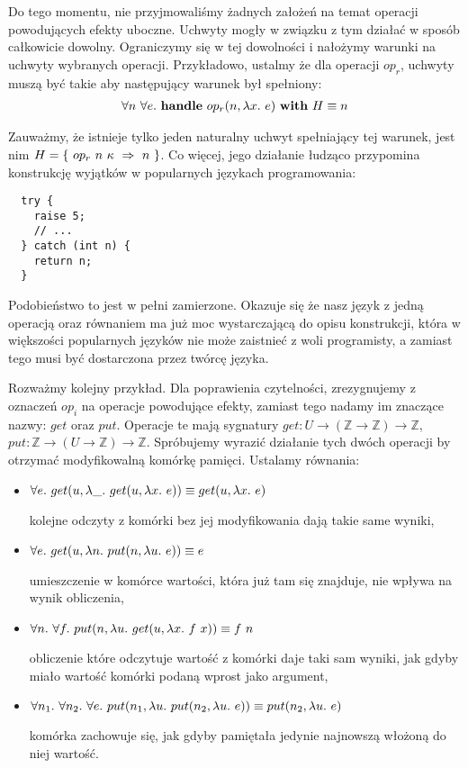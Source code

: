 Do tego momentu, nie przyjmowaliśmy żadnych założeń na temat operacji powodujących efekty uboczne. Uchwyty mogły w związku z tym działać w sposób całkowicie dowolny. Ograniczymy się w tej dowolności i nałożymy warunki na uchwyty wybranych operacji. Przykładowo, ustalmy że dla operacji \(op_r\), uchwyty muszą być takie aby następujący warunek był spełniony:
\begin{align}
  \forall n\ \forall e.\ \mathbf{handle}\ op_r(n, \lambda x.\ e)\ \mathbf{with}\ H \equiv n
\end{align}

Zauważmy, że istnieje tylko jeden naturalny uchwyt spełniający tej warunek, jest nim \(H = \{\ \hcase{op_r}{n\ \kappa}{n} \ \}\). Co więcej, jego działanie łudząco przypomina konstrukcję wyjątków w popularnych językach programowania:

\begin{lstlisting}
  try {
    raise 5;
    // ...
  } catch (int n) {
    return n;
  }
\end{lstlisting}

Podobieństwo to jest w pełni zamierzone. Okazuje się że nasz język z jedną operacją oraz równaniem ma już moc wystarczającą do opisu konstrukcji, która w większości popularnych języków nie może zaistnieć z woli programisty, a zamiast tego musi być dostarczona przez twórcę języka.

Rozważmy kolejny przykład. Dla poprawienia czytelności, zrezygnujemy z oznaczeń \(op_i\) na operacje powodujące efekty, zamiast tego nadamy im znaczące nazwy: \(get\) oraz \(put\). Operacje te mają sygnatury \(get: U \rightarrow (\mathbb{Z} \rightarrow \mathbb{Z}) \rightarrow \mathbb{Z}\), \(put: \mathbb{Z} \rightarrow (U \rightarrow \mathbb{Z}) \rightarrow \mathbb{Z}\). Spróbujemy wyrazić działanie tych dwóch operacji by otrzymać modyfikowalną komórkę pamięci. Ustalamy równania:

\begin{itemize}
\item \(\forall e.\ get(u, \lambda \_.\ get(u, \lambda x.\ e)) \equiv get(u, \lambda x.\ e)\)

  kolejne odczyty z komórki bez jej modyfikowania dają takie same wyniki,
\item \(\forall e.\ get(u, \lambda n.\ put(n, \lambda u.\ e)) \equiv e\)

  umieszczenie w komórce wartości, która już tam się znajduje, nie wpływa na wynik obliczenia,
\item \(\forall n.\ \forall f.\ put(n, \lambda u.\ get(u, \lambda x.\ f\ x)) \equiv f\ n\)

  obliczenie które odczytuje wartość z komórki daje taki sam wyniki, jak gdyby miało wartość komórki podaną wprost jako argument,
\item \(\forall n_1.\ \forall n_2.\ \forall e.\ put(n_1, \lambda u.\ put(n_2, \lambda u.\ e)) \equiv put(n_2, \lambda u.\ e)\)

  komórka zachowuje się, jak gdyby pamiętała jedynie najnowszą włożoną do niej wartość.
\end{itemize}

